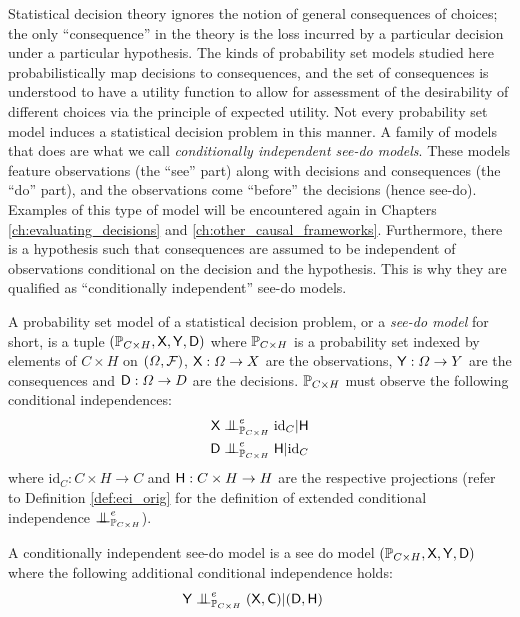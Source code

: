 Statistical decision theory ignores the notion of general consequences of choices; the only ``consequence'' in the theory is the loss incurred by a particular decision under a particular hypothesis. The kinds of probability set models studied here probabilistically map decisions to consequences, and the set of consequences is understood to have a utility function to allow for assessment of the desirability of different choices via the principle of expected utility. Not every probability set model induces a statistical decision problem in this manner. A family of models that does are what we call \emph{conditionally independent see-do models}. These models feature observations (the ``see'' part) along with decisions and consequences (the ``do'' part), and the observations come ``before'' the decisions (hence see-do). Examples of this type of model will be encountered again in Chapters \ref{ch:evaluating_decisions} and \ref{ch:other_causal_frameworks}. Furthermore, there is a hypothesis such that consequences are assumed to be independent of observations conditional on the decision and the hypothesis. This is why they are qualified as ``conditionally independent'' see-do models.
\begin{definition}\label{def:see_do_model}
A probability set model of a statistical decision problem, or a \emph{see-do model} for short, is a tuple $(\mathbb{P}_{C\times H}, \mathsf{X},\mathsf{Y},\mathsf{D})$ where $\mathbb{P}_{C\times H}$ is a probability set indexed by elements of $C\times H$ on $(\Omega,\mathcal{F})$, $\mathsf{X}:\Omega\to X$ are the observations, $\mathsf{Y}:\Omega\to Y$ are the consequences and $\mathsf{D}:\Omega\to D$ are the decisions. $\mathbb{P}_{C\times H}$ must observe the following conditional independences:
\begin{align}
    \RV{X}&\CI^e_{\prob{P}_{C\times H}} \text{id}_C|\RV{H}\\
    \RV{D}&\CI^e_{\prob{P}_{C\times H}} \RV{H}|\text{id}_C
\end{align}
where $\text{id}_C:C\times H\to C$ and $\mathsf{H}:C\times H\to H$ are the respective projections (refer to Definition \ref{def:eci_orig} for the definition of extended conditional independence $\CI_{\prob{P}_{C\times H}}^e$).
\end{definition}
\begin{definition}\label{def:ci_see_do_model}
A conditionally independent see-do model is a see do model $(\mathbb{P}_{C\times H}, \mathsf{X},\mathsf{Y},\mathsf{D})$ where the following additional conditional independence holds:
\begin{align}
    \RV{Y}&\CI^e_{\prob{P}_{C\times H}} (\RV{X,C})|(\RV{D},\RV{H})
\end{align}
\end{definition}
